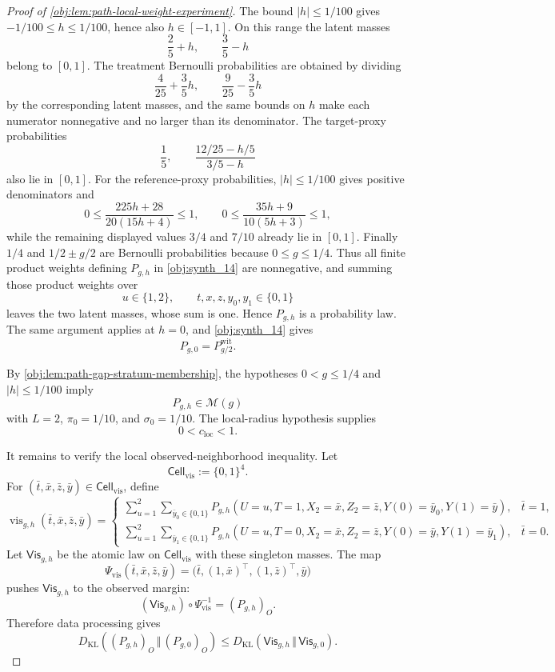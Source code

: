\begin{proof}[Proof of \cref{obj:lem:path-local-weight-experiment}]
The bound \(|h|\le 1/100\) gives \(-1/100\le h\le 1/100\), hence also \(h\in[-1,1]\).  On this range the latent masses
\[
\frac25+h,\qquad \frac35-h
\]
belong to \([0,1]\).  The treatment Bernoulli probabilities are obtained by dividing
\[
\frac4{25}+\frac35h,\qquad \frac9{25}-\frac35h
\]
by the corresponding latent masses, and the same bounds on \(h\) make each numerator nonnegative and no larger than its denominator.  The target-proxy probabilities
\[
\frac15,\qquad \frac{12/25-h/5}{3/5-h}
\]
also lie in \([0,1]\).  For the reference-proxy probabilities, \(|h|\le1/100\) gives positive denominators and
\[
0\le
\frac{225h+28}{20(15h+4)}
\le 1,
\qquad
0\le
\frac{35h+9}{10(5h+3)}
\le 1,
\]
while the remaining displayed values \(3/4\) and \(7/10\) already lie in \([0,1]\).  Finally \(1/4\) and \(1/2\pm g/2\) are Bernoulli probabilities because \(0\le g\le 1/4\).  Thus all finite product weights defining \(P_{g,h}\) in \cref{obj:synth_14} are nonnegative, and summing those product weights over
\[
u\in\{1,2\},\qquad t,x,z,y_0,y_1\in\{0,1\}
\]
leaves the two latent masses, whose sum is one.  Hence \(P_{g,h}\) is a probability law.  The same argument applies at \(h=0\), and \cref{obj:synth_14} gives
\[
P_{g,0}=P^{\mathrm{wit}}_{g/2}.
\] %

By \cref{obj:lem:path-gap-stratum-membership}, the hypotheses \(0<g\le 1/4\) and \(|h|\le 1/100\) imply
\[
P_{g,h}\in\mathcal M(g)
\]
with \(L=2\), \(\pi_0=1/10\), and \(\sigma_0=1/10\).  The local-radius hypothesis supplies
\[
0<c_{\mathrm{loc}}<1 .
\] %

It remains to verify the local observed-neighborhood inequality.  Let
\[
\mathsf{Cell}_{\mathrm{vis}}:=\{0,1\}^4 .
\]
For \((\bar t,\bar x,\bar z,\bar y)\in\mathsf{Cell}_{\mathrm{vis}}\), define
\[
\operatorname{vis}_{g,h}(\bar t,\bar x,\bar z,\bar y)
=
\begin{cases}
\displaystyle
\sum_{u=1}^{2}\sum_{\bar y_0\in\{0,1\}}
P_{g,h}(U=u,T=1,X_2=\bar x,Z_2=\bar z,Y(0)=\bar y_0,Y(1)=\bar y),
& \bar t=1,\\[0.9em]
\displaystyle
\sum_{u=1}^{2}\sum_{\bar y_1\in\{0,1\}}
P_{g,h}(U=u,T=0,X_2=\bar x,Z_2=\bar z,Y(0)=\bar y,Y(1)=\bar y_1),
& \bar t=0 .
\end{cases}
\]
Let \(\mathsf{Vis}_{g,h}\) be the atomic law on \(\mathsf{Cell}_{\mathrm{vis}}\) with these singleton masses.  The map
\[
\Psi_{\mathrm{vis}}(\bar t,\bar x,\bar z,\bar y)
=
\bigl(\bar t,(1,\bar x)^\top,(1,\bar z)^\top,\bar y\bigr)
\]
pushes \(\mathsf{Vis}_{g,h}\) to the observed margin:
\[
(\mathsf{Vis}_{g,h})\circ\Psi_{\mathrm{vis}}^{-1}=(P_{g,h})_O .
\]
Therefore data processing gives
\[
D_{\mathrm{KL}}\!\left((P_{g,h})_O\,\Vert\,(P_{g,0})_O\right)
\le
D_{\mathrm{KL}}\!\left(\mathsf{Vis}_{g,h}\,\Vert\,\mathsf{Vis}_{g,0}\right).
\] %


\end{proof}
